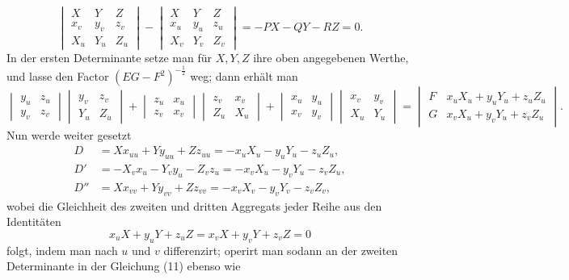 \documentclass[11pt,a4paper,leqno]{article}
\begin{document}
\begin{equation}\tag{11}
\begin{vmatrix}
X&Y&Z\\
x_v&y_v&z_v\\
X_u&Y_u&Z_u
\end{vmatrix}
-
\begin{vmatrix}
X&Y&Z\\
x_u&y_u&z_u\\
X_v&Y_v&Z_v
\end{vmatrix}
=-PX-QY-RZ=0.
\end{equation}
In der ersten Determinante setze man für $X,Y,Z$ ihre oben
angegebenen Werthe, und lasse den Factor $(EG-F^2)^{-\frac12}$ weg;
dann erhält man
\[
\begin{vmatrix}y_u&z_u\\y_v&z_v\end{vmatrix}
\begin{vmatrix}y_v&z_v\\Y_u&Z_u\end{vmatrix}
+
\begin{vmatrix}z_u&x_u\\z_v&x_v\end{vmatrix}
\begin{vmatrix}z_v&x_v\\Z_u&X_u\end{vmatrix}
+
\begin{vmatrix}x_u&y_u\\x_v&y_v\end{vmatrix}
\begin{vmatrix}x_v&y_v\\X_u&Y_u\end{vmatrix}
=
\begin{vmatrix}
F&x_uX_u+y_uY_u+z_uZ_u\\
G&x_vX_u+y_vY_u+z_vZ_u
\end{vmatrix}.
\]
Nun werde weiter gesetzt
\[
\begin{aligned}
D&=Xx_{uu}+Yy_{uu}+Zz_{uu}
=-x_uX_u-y_uY_u-z_uZ_u,\\
D'&=-X_vx_u-Y_vy_u-Z_vz_u
=-x_vX_u-y_vY_u-z_vZ_u,\\
D''&=Xx_{vv}+Yy_{vv}+Zz_{vv}
=-x_vX_v-y_vY_v-z_vZ_v,
\end{aligned}
\]
wobei die Gleichheit des zweiten und dritten Aggregats jeder Reihe
aus den Identitäten
\[
x_uX+y_uY+z_uZ=x_vX+y_vY+z_vZ=0
\]
folgt, indem man nach $u$ und $v$ differenzirt; operirt man sodann
an der zweiten Determinante in der Gleichung (11) ebenso wie
\end{document}
